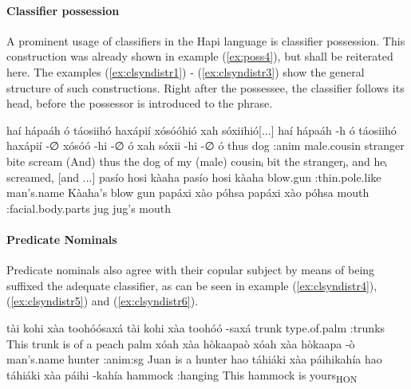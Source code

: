 \documentclass[a4paper, 12pt, oneside]{memoir}
\begin{document}
\paragraph{Classifier possession}
A prominent usage of classifiers in the Hapi language is classifier possession. This construction was already shown in example (\ref{ex:poss4}), but shall be reiterated here. The examples (\ref{ex:clsyndistr1}) - (\ref{ex:clsyndistr3}) show the general structure of such constructions. Right after the possessee, the classifier follows its head, before the possessor is introduced to the phrase. 
\begin{examples}
\newbaarucmd{\cl}{\baarujuncture{\texttt{==}}}
\ex \label{ex:clsyndistr1}
\words haí hápaáh ó táosiihó haxápií xósóóhió xah sóxiihió[...] 
\bits haí hápaáh -h ó táosiihó haxápií -∅ xósóó -hi -∅ \cl ó xah sóxii -hi -∅ \cl ó 
\gloss thus dog {\Erg} {\Cl}:anim male.cousin stranger {\Abs} bite {\Rpastt} {\St} {\Seq} {\Fourth}  scream {\Rpastt} {\St} {\Seq}
\tr (And) thus the dog of my (male) cousinᵢ bit the strangerⱼ, and heᵢ screamed, [and ...]
\ex \label{ex:clsyndistr2}
\words pasío hosi kàaha
\bits pasío hosi kàaha 
\gloss blow.gun {\Cl}:thin.pole.like man's.name
\tr Kàaha's blow gun
\ex \label{ex:clsyndistr3}
\words papáxi xào póhsa
\bits papáxi xào póhsa
\gloss mouth {\Cl}:facial.body.parts jug
\tr jug's mouth
\end{examples}
\paragraph{Predicate Nominals}
Predicate nominals also agree with their copular subject by means of being suffixed the adequate classifier, as can be seen in example (\ref{ex:clsyndistr4}), (\ref{ex:clsyndistr5}) and (\ref{ex:clsyndistr6}). 
\begin{examples}
\ex \label{ex:clsyndistr4}
\words tài kohi xàa toohóósaxá
\bits tài kohi xàa toohóó -saxá
\gloss {\Demprox} trunk {\Cop} type.of.palm {\Cl}:trunks
\tr This trunk is of a peach palm
\ex \label{ex:clsyndistr5}
\words xóah xàa hòkaapaò
\bits xóah xàa hòkaapa -ò
\gloss man's.name {\Cop} hunter {\Cl}:anim:sg
\tr Juan is a hunter
\ex \label{ex:clsyndistr6}
\words hao táhiáki xàa páihikahía
\bits hao táhiáki xàa páihi -kahía
\gloss {\Dem} hammock {\Cop} {\Sshposs} {\Cl}:hanging
\tr This hammock is yours\textsubscript{HON}
\end{examples}
\end{document}
